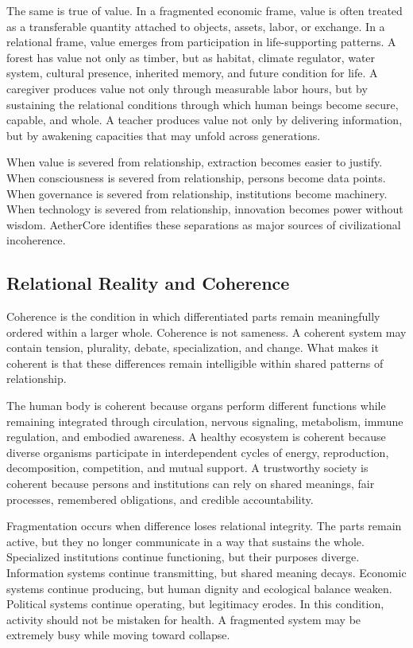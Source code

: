 \documentclass[12pt]{article}
\begin{document}
The same is true of value. In a fragmented economic frame, value is often treated as a transferable quantity attached to objects, assets, labor, or exchange. In a relational frame, value emerges from participation in life-supporting patterns. A forest has value not only as timber, but as habitat, climate regulator, water system, cultural presence, inherited memory, and future condition for life. A caregiver produces value not only through measurable labor hours, but by sustaining the relational conditions through which human beings become secure, capable, and whole. A teacher produces value not only by delivering information, but by awakening capacities that may unfold across generations.

When value is severed from relationship, extraction becomes easier to justify. When consciousness is severed from relationship, persons become data points. When governance is severed from relationship, institutions become machinery. When technology is severed from relationship, innovation becomes power without wisdom. AetherCore identifies these separations as major sources of civilizational incoherence.

\subsection{Relational Reality and Coherence}

Coherence is the condition in which differentiated parts remain meaningfully ordered within a larger whole. Coherence is not sameness. A coherent system may contain tension, plurality, debate, specialization, and change. What makes it coherent is that these differences remain intelligible within shared patterns of relationship.

The human body is coherent because organs perform different functions while remaining integrated through circulation, nervous signaling, metabolism, immune regulation, and embodied awareness. A healthy ecosystem is coherent because diverse organisms participate in interdependent cycles of energy, reproduction, decomposition, competition, and mutual support. A trustworthy society is coherent because persons and institutions can rely on shared meanings, fair processes, remembered obligations, and credible accountability.

Fragmentation occurs when difference loses relational integrity. The parts remain active, but they no longer communicate in a way that sustains the whole. Specialized institutions continue functioning, but their purposes diverge. Information systems continue transmitting, but shared meaning decays. Economic systems continue producing, but human dignity and ecological balance weaken. Political systems continue operating, but legitimacy erodes. In this condition, activity should not be mistaken for health. A fragmented system may be extremely busy while moving toward collapse.
\end{document}

